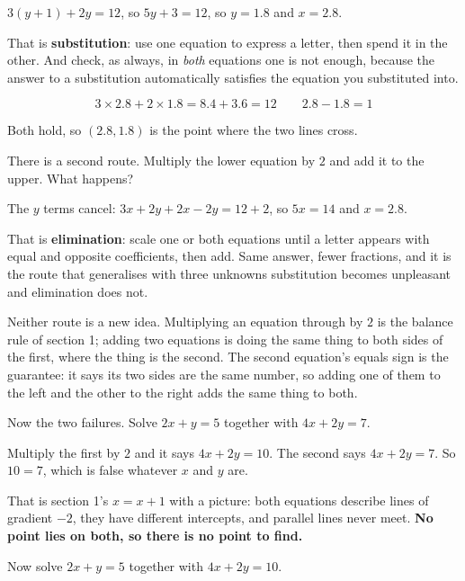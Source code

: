 \begin{fr}
\begin{ansblock}
$3(y + 1) + 2y = 12$, so $5y + 3 = 12$, so $y = \num{1.8}$ and
$x = \num{2.8}$.
\end{ansblock}

That is \textbf{substitution}: use one equation to express a letter, then
spend it in the other. And check, as always, in \emph{both} equations \dash{}
one is not enough, because the answer to a substitution automatically
satisfies the equation you substituted into.

\[ 3 \times \num{2.8} + 2 \times \num{1.8} = \num{8.4} + \num{3.6} = 12
   \qquad \num{2.8} - \num{1.8} = 1 \]

Both hold, so $(\num{2.8}, \num{1.8})$ is the point where the two lines cross.

There is a second route. Multiply the lower equation by $2$ and add it to the
upper. What happens?
\nextframe
\end{fr}

\begin{fr}
\begin{ansblock}
The $y$ terms cancel: $3x + 2y + 2x - 2y = 12 + 2$, so $5x = 14$ and
$x = \num{2.8}$.
\end{ansblock}

That is \textbf{elimination}: scale one or both equations until a letter
appears with equal and opposite coefficients, then add. Same answer, fewer
fractions, and it is the route that generalises \dash{} with three unknowns
substitution becomes unpleasant and elimination does not.

Neither route is a new idea. Multiplying an equation through by $2$ is the
balance rule of section 1; adding two equations is doing the same thing to
both sides of the first, where the thing is the second. The second equation's
equals sign is the guarantee: it says its two sides are the same number, so
adding one of them to the left and the other to the right adds the same thing
to both.

Now the two failures. Solve $2x + y = 5$ together with $4x + 2y = 7$.
\dotline
\nextframe
\end{fr}

\begin{fr}
Multiply the first by $2$ and it says $4x + 2y = 10$. The second says
$4x + 2y = 7$. So $10 = 7$, which is false whatever $x$ and $y$ are.

That is section 1's $x = x + 1$ with a picture: both equations describe lines
of gradient $-2$, they have different intercepts, and parallel lines never
meet. \textbf{No point lies on both, so there is no point to find.}

Now solve $2x + y = 5$ together with $4x + 2y = 10$.
\nextframe
\end{fr}

